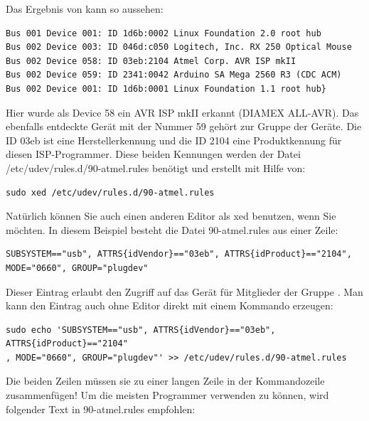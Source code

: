 Das Ergebnis von  kann so aussehen:
\begin{footnotesize} \begin{verbatim}
Bus 001 Device 001: ID 1d6b:0002 Linux Foundation 2.0 root hub
Bus 002 Device 003: ID 046d:c050 Logitech, Inc. RX 250 Optical Mouse
Bus 002 Device 058: ID 03eb:2104 Atmel Corp. AVR ISP mkII
Bus 002 Device 059: ID 2341:0042 Arduino SA Mega 2560 R3 (CDC ACM)
Bus 002 Device 001: ID 1d6b:0001 Linux Foundation 1.1 root hub}
\end{verbatim} \end{footnotesize}
Hier wurde als Device 58 ein AVR ISP mkII erkannt (DIAMEX ALL-AVR).
Das ebenfalls entdeckte Gerät mit der Nummer 59 gehört zur Gruppe der  Geräte.
Die ID 03eb ist eine Herstellerkennung und die ID 2104 eine Produktkennung für diesen ISP-Programmer.
Diese beiden Kennungen werden der Datei /etc/udev/rules.d/90-atmel.rules benötigt und erstellt
mit Hilfe von:
\begin{large} \vspace{-0.4em} \begin{verbatim}
sudo xed /etc/udev/rules.d/90-atmel.rules
\end{verbatim} \end{large}
Natürlich können Sie auch einen anderen Editor als xed benutzen, wenn Sie möchten.
In diesem Beispiel besteht die Datei 90-atmel.rules aus einer Zeile:
\begin{footnotesize} \vspace{-0.4em} \begin{verbatim}
SUBSYSTEM=="usb", ATTRS{idVendor}=="03eb", ATTRS{idProduct}=="2104", MODE="0660", GROUP="plugdev"
\end{verbatim} \end{footnotesize}
Dieser Eintrag erlaubt den Zugriff auf das Gerät für Mitglieder der Gruppe .
Man kann den Eintrag auch ohne Editor direkt mit einem Kommando erzeugen:
\begin{footnotesize} \vspace{-0.4em} \begin{verbatim}
sudo echo 'SUBSYSTEM=="usb", ATTRS{idVendor}=="03eb", ATTRS{idProduct}=="2104"
, MODE="0660", GROUP="plugdev"' >> /etc/udev/rules.d/90-atmel.rules
\end{verbatim} \end{footnotesize}
Die beiden Zeilen müssen sie zu einer langen Zeile 
in der Kommandozeile zusammenfügen!
\newline
Um die meisten Programmer verwenden zu können, wird folgender Text in 90-atmel.rules empfohlen:
